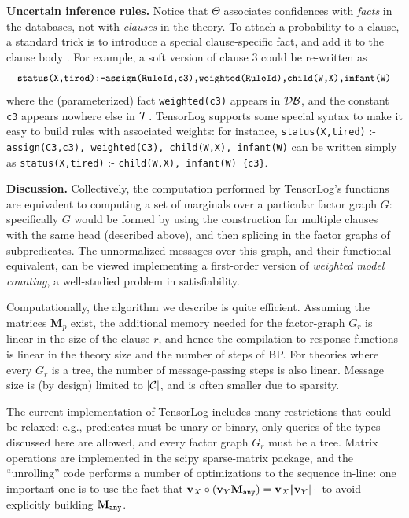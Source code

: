\documentclass{article}
\newcommand{\cd}[1]{{\small \texttt{#1}}}
\newcommand{\mysubsection}[1]{\textbf{{#1}.}}
\newif\iflong
\newcommand{\longonly}[1]{\iflong{#1}\fi}
\newcommand{\trm}[1]{\textit{#1}}
\newcommand{\vek}[1]{\textbf{#1}}
\newcommand{\M}{\textbf{M}}
\newcommand{\C}{{\cal{C}}}
\newcommand{\T}{{\cal{T}}}
\newcommand{\DB}{{\cal{DB}}}
\newcommand{\onenorm}[1]{{|\!|{#1}|\!|_1}}
\begin{document}
\mysubsection{Uncertain inference rules} \label{sec:soft-rules} Notice
that $\Theta$ associates confidences with \emph{facts} in the
databases, not with \emph{clauses} in the theory.  To attach a
probability to a clause, a standard trick is to introduce a special
clause-specific fact, and add it to the clause body
\cite{poole1997independent}.  For example, a soft version of clause 3
could be re-written as
\[
\cd{status(X,tired):-assign(RuleId,c3),weighted(RuleId),child(W,X),infant(W)}
\]
where the (parameterized) fact \cd{weighted(c3)} appears in $\DB$, and
the constant \cd{c3} appears nowhere else in $\T$.  TensorLog supports
some special syntax to make it easy to build rules with associated
weights: for instance, \cd{status(X,tired)} :- \cd{assign(C3,c3),
  weighted(C3), child(W,X), infant(W)} can be written simply as
\cd{status(X,tired)} :- \cd{child(W,X), infant(W) \{c3\}}.  \longonly{
  One can also attach a computed set of features to a rule in order to
  weight it, as in ProPPR: e.g., one can write \cd{status(X,tired)} :-
  \cd{\{all(A):child(W,X),age(W,A)\}}, which indicates that the all
  the ages of the children of $X$ should be used as features to
  determine if the rule succeeds, and it will be expanded to
  \cd{status(X,tired)} :- \cd{child(W,X),age(W,A),weighted(A)}.  These
  features are used in the experiments below, where we compare to
  ProPPR.}

\mysubsection{Discussion}
Collectively, the computation performed by TensorLog's functions are
equivalent to computing a set of marginals over a particular factor
graph $G$: specifically $G$ would be formed by using the construction
for multiple clauses with the same head (described above), and then
splicing in the factor graphs of subpredicates.  The unnormalized
messages over this graph, and their functional equivalent, can be
viewed implementing a first-order version of \trm{weighted model
  counting}, a well-studied problem in satisfiability.

Computationally, the algorithm we describe is quite
efficient. Assuming the matrices $\M_p$ exist, the additional memory
needed for the factor-graph $G_r$ is linear in the size of the clause
$r$, and hence the compilation to response functions is linear in the
theory size and the number of steps of BP.  For theories where every
$G_r$ is a tree, the number of message-passing steps is also linear.
Message size is (by design) limited to $|\C|$, and is often smaller
due to sparsity.

The current implementation of TensorLog includes many restrictions
that could be relaxed: e.g., predicates must be unary or binary, only
queries of the types discussed here are allowed, and every factor
graph $G_r$ must be a tree. 
Matrix operations are implemented in the
scipy sparse-matrix package, and the ``unrolling'' code performs a
number of optimizations to the sequence in-line: one important one is
to use the fact that \( \vek{v}_X \circ (\vek{v}_Y \M_\cd{any}) =
\vek{v}_X \onenorm{\vek{v}_Y} \) to avoid explicitly building
$\M_\cd{any}$.  
\end{document}
